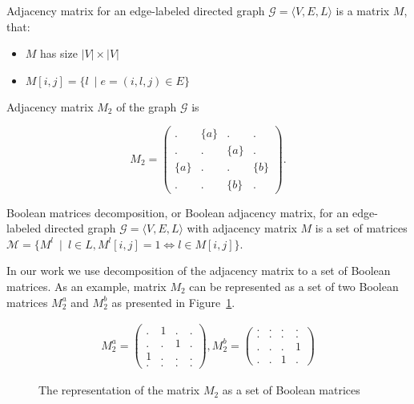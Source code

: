 \begin{definition}
Adjacency matrix for an edge-labeled directed graph $\mathcal{G} = \langle V,E,L \rangle$ is a matrix $M$, that:
\begin{itemize}
    \item $M$ has size $|V|\times|V|$
    \item $M[i,j] = \{l~\mid e = (i,l,j) \in E\}$
\end{itemize}
\end{definition}

Adjacency matrix $M_2$ of the graph $\mathcal{G}$ is 

$$
    M_2 =
    \begin{pmatrix}
    . & \{a\} & . & .     \\
    . & . & \{a\} & .     \\
    \{a\} & . & . & \{b\} \\
    . & . & \{b\} & .
    \end{pmatrix}.
$$

\begin{definition}
Boolean matrices decomposition, or Boolean adjacency matrix, 
for an edge-labeled directed graph $\mathcal{G} = 
\langle V,E,L \rangle$ with adjacency matrix $M$ is a set of matrices $\mathcal{M} = \{ M^l~\mid~l \in L,M^l[i,j] = 1 \iff l \in M[i,j]\}$.
\end{definition}

In our work we use decomposition of the adjacency matrix to a set of Boolean matrices. As an example, matrix $M_2$ can be represented as a set of two Boolean matrices $M_2^a$ and $M_2^b$ as presented in Figure~\ref{fig:boolean_decomposition_of_graph}.

\begin{figure}[h]
    \centering
\begin{align}
M_2^{a} =
\begin{pmatrix}
    . & 1 & . & .   \\
    . & . & 1 & .   \\
    1 & . & . & .   \\
    . & . & . & .  
\end{pmatrix}, 
M_2^{b} =
\begin{pmatrix}      
    . & . & . & .   \\
    . & . & . & .   \\
    . & . & . & 1   \\
    . & . & 1 & . 
\end{pmatrix}
\end{align}
   \caption{The representation of the matrix $M_2$ as a set of Boolean matrices}
\label{fig:boolean_decomposition_of_graph}
\end{figure}

